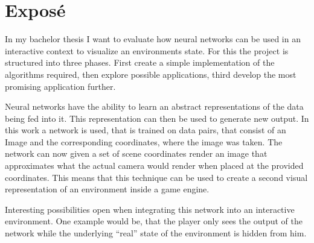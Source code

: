 \chapter*{Expos\'e}
In my bachelor thesis I want to evaluate how neural networks can be used in an interactive context to visualize an environments state. For this the project is structured into three phases. First create a simple implementation of the algorithms required, then explore possible applications, third develop the most promising application further.

Neural networks have the ability to learn an abstract representations of the data being fed into it. This representation can then be used to generate new output. In this work a network is used, that is trained on data pairs, that consist of an Image and the corresponding coordinates, where the image was taken.  The network can now given a set of scene coordinates render an image that approximates what the actual camera would render when placed at the provided coordinates. This means that this technique can be used to create a second visual representation of an environment inside a game engine. 

Interesting possibilities open when integrating this network into an interactive environment. One example would be, that the player only sees the output of the network while the underlying “real” state of the environment is hidden from him.

